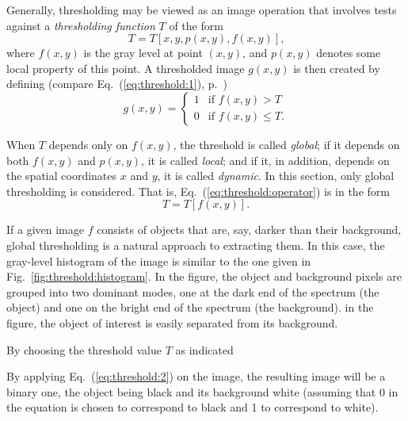 Generally, thresholding may be viewed as an image operation that
involves tests against a {\em thresholding function\/} $T$ of the form
\begin{equation}
\label{eq:threshold:operator}
  T=T[x,y,p(x,y),f(x,y)]\mbox{,}
\end{equation}
where $f(x,y)$ is the gray level at point $(x,y)$, and $p(x,y)$
denotes some local property of this point.  A thresholded image
$g(x,y)$ is then created by defining (compare
Eq.~(\ref{eq:threshold:1}), p.~\pageref{eq:threshold:1})
\begin{equation}
\label{eq:threshold:2}
  g(x,y)=\left\{
    \begin{array}{ll}
      1 & \mbox{if $f(x,y)>T$} \\
      0 & \mbox{if $f(x,y)\leq T$.}
    \end{array}\right.
\end{equation}

When $T$ depends only on $f(x,y)$, the threshold is called {\em
  global\/}; if it depends on both $f(x,y)$ and $p(x,y)$, it is called
{\em local\/}; and if it, in addition, depends on the spatial
coordinates $x$ and $y$, it is called {\em dynamic\/}.  In this
section, only global thresholding is considered.  That is,
Eq.~(\ref{eq:threshold:operator}) is in the form
\begin{equation}
  T=T[f(x,y)]\mbox{.}
\end{equation}

If a given image $f$ consists of objects that are, say, darker than
their background, global thresholding is a natural approach to
extracting them.  In this case, the gray-level histogram of the image
is similar to the one given in Fig.~\ref{fig:threshold:histogram}.  In
the figure, the object and background pixels are grouped into two
dominant modes, one at the dark end of the spectrum (the object) and
one on the bright end of the spectrum (the background).
in the figure, the object of interest is easily separated from its
background.

 By choosing the threshold value $T$ as indicated

By applying Eq.~(\ref{eq:threshold:2}) on the image, the resulting
image will be a binary one, the object being black and its background
white (assuming that 0 in the equation is chosen to correspond to
black and 1 to correspond to white).

